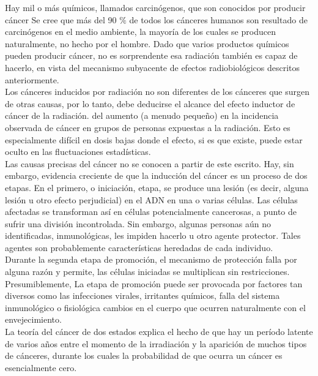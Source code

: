 \documentclass[]{article}
\begin{document}
Hay mil o más químicos, llamados carcinógenos, que son conocidos por producir cáncer Se cree que más del 90 $\%$ de todos los cánceres humanos son resultado de carcinógenos en el medio ambiente, la mayoría de los cuales se producen naturalmente, no hecho por el hombre. Dado que varios productos químicos pueden producir cáncer, no es sorprendente esa radiación también es capaz de hacerlo, en vista del mecanismo subyacente de efectos radiobiológicos descritos anteriormente.\\

Los cánceres inducidos por radiación no son diferentes de los cánceres que surgen de otras causas, por lo tanto, debe deducirse el alcance del efecto inductor de cáncer de la radiación. del aumento (a menudo pequeño) en la incidencia observada de cáncer en grupos de personas expuestas a la radiación. Esto es especialmente difícil en dosis bajas donde el efecto, si es que existe, puede estar oculto en las fluctuaciones estadísticas.\\

Las causas precisas del cáncer no se conocen a partir de este escrito. Hay, sin embargo, evidencia creciente de que la inducción del cáncer es un proceso de dos etapas. En el primero, o iniciación, etapa, se produce una lesión (es decir, alguna lesión u otro efecto perjudicial) en el ADN en una o varias células. Las células afectadas se transforman así en células potencialmente cancerosas, a punto de sufrir una división incontrolada. Sin embargo, algunas personas aún no identificadas, inmunológicas, les impiden hacerlo u otro agente protector. Tales agentes son probablemente características heredadas de cada individuo.\\

Durante la segunda etapa de promoción, el mecanismo de protección falla por alguna razón y permite, las células iniciadas se multiplican sin restricciones. Presumiblemente, La etapa de promoción puede ser provocada por factores tan diversos como las infecciones virales, irritantes químicos, falla del sistema inmunológico o fisiológica cambios en el cuerpo que ocurren naturalmente con el envejecimiento.\\

La teoría del cáncer de dos estados explica el hecho de que hay un período latente de varios años entre el momento de la irradiación y la aparición de muchos tipos de cánceres, durante los cuales la probabilidad de que ocurra un cáncer es esencialmente cero.\\
\end{document}

